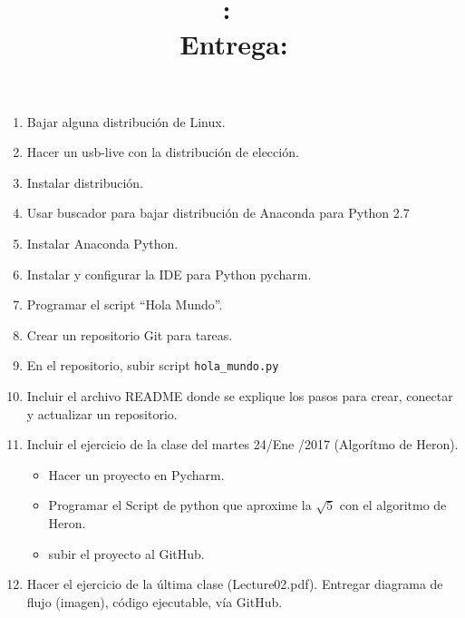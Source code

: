 \documentclass{article}
\title{
	\vspace{2in}
	\textmd{\textbf{\hmwkClass:\ \hmwkTitle}}\\
	\normalsize\vspace{0.1in}\small{Entrega: \hmwkDueDate}\\
	\vspace{0.1in}\large{\textit{\hmwkClassInstructor}}
	\vspace{3in}
}
\author{\textbf{\hmwkAuthorName}}
\date{} %
\begin{document}
	\maketitle

	\newpage
	\begin{enumerate}
		\item
			Bajar alguna distribuci\'on de Linux.
		\item
			Hacer un usb-live con la distribuci\'on de elecci\'on.
		\item
			Instalar distribuci\'on.
		\item
			Usar buscador para bajar distribuci\'on de Anaconda para 
			Python 2.7
		\item
			Instalar Anaconda Python.
		\item
			Instalar y configurar la IDE para Python pycharm.
		\item
			Programar el script ``Hola Mundo''.
		\item
			Crear un repositorio Git para tareas.
		\item
			En el repositorio, subir script \verb|hola_mundo.py|
		\item
			Incluir el archivo README donde se explique los pasos para
			crear, conectar y actualizar un repositorio.
		\item
			Incluir el ejercicio de la clase del martes 24/Ene /2017 (Algor\'itmo de Heron).
		\begin{itemize}
			\item Hacer un proyecto en Pycharm.
			\item Programar el Script de python que aproxime la $\sqrt{5}$ con
			el algoritmo de Heron.
			\item
			subir el proyecto al GitHub.
		\end{itemize}
		\item
			Hacer el ejercicio de la última clase (Lecture02.pdf). 
			Entregar diagrama de flujo (imagen), código ejecutable, vía GitHub.
\end{enumerate}
\end{document}
